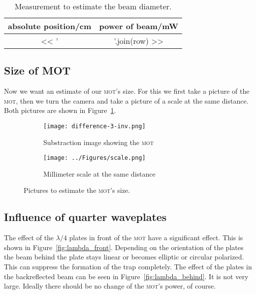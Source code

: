 \documentclass[11pt, english, fleqn, DIV=15, headinclude, BCOR=2cm]{scrreprt}
\newcommand\mot{\textsc{mot}}
\begin{document}
\begin{table}
    \centering
    \begin{tabular}{SS}
        \toprule
        {absolute position/\si{\centi\meter}}
        & {power of beam/\si{\milli\watt}} \\
        \midrule
        << ' & '.join(row) >> \\
        \bottomrule
    \end{tabular}
    \caption{%
        Measurement to estimate the beam diameter.
    }
    \label{tab:beam_diameter}
\end{table}

\subsection{Size of MOT}

Now we want an estimate of our \mot's size. For this we first take a picture of
the \mot, then we turn the camera and take a picture of a scale at the same
distance. Both pictures are shown in Figure~\ref{fig:mot_size}.

\begin{figure}
    \begin{subfigure}{.45\textwidth}
        \centering
        \texttt{[image: difference-3-inv.png]}
        \caption{Substraction image showing the \mot}
    \end{subfigure}
    \hfill
    \begin{subfigure}{.45\textwidth}
        \centering
        \texttt{[image: ../Figures/scale.png]}
        \caption{Millimeter scale at the same distance}
    \end{subfigure}
    \caption{Pictures to estimate the \mot's size.}
    \label{fig:mot_size}
\end{figure}

\subsection{Influence of quarter waveplates}

The effect of the $\lambda/4$ plates in front of the \mot{} have a significant
effect. This is shown in Figure~\ref{fig:lambda_front}. Depending on the
orientation of the plates the beam behind the plate stays linear or becomes
elliptic or circular polarized. This can suppress the formation of the
trap completely. The effect of the plates in the
backreflected beam can be seen in Figure~\ref{fig:lambda_behind}. It is not very
large. Ideally there should be no change of the \mot's power, of course.
\end{document}
